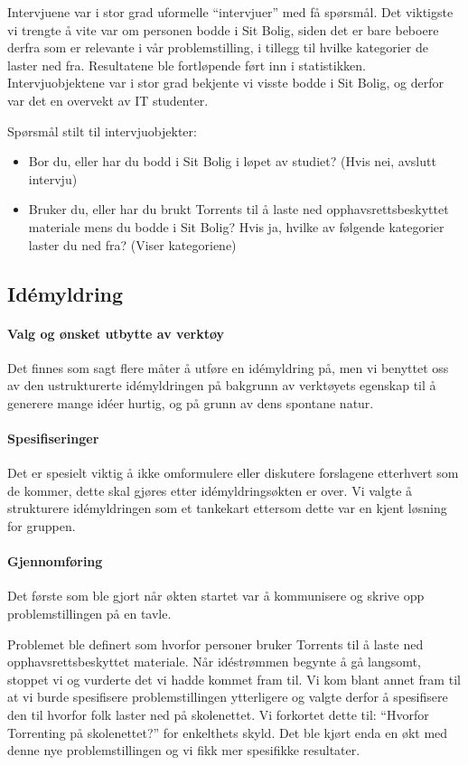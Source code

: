 Intervjuene var i stor grad uformelle ``intervjuer'' med få spørsmål. Det viktigste vi trengte å vite var om personen bodde i Sit Bolig, siden det er bare beboere derfra som er relevante i vår problemstilling, i tillegg til hvilke kategorier de laster ned fra. Resultatene ble fortløpende ført inn i statistikken. Intervjuobjektene var i stor grad bekjente vi visste bodde i Sit Bolig, og derfor var det en overvekt av IT studenter.

Spørsmål stilt til intervjuobjekter:
\begin{itemize}
    \item Bor du, eller har du bodd i Sit Bolig i løpet av studiet? (Hvis nei, avslutt intervju)
    \item Bruker du, eller har du brukt Torrents til å laste ned opphavsrettsbeskyttet materiale mens du bodde i Sit Bolig? Hvis ja, hvilke av følgende kategorier laster du ned fra? (Viser kategoriene)
\end{itemize}


\subsection{Idémyldring}

\paragraph{Valg og ønsket utbytte av verktøy}
Det finnes som sagt flere måter å utføre en idémyldring på, men vi benyttet oss av den ustrukturerte idémyldringen på bakgrunn av verktøyets egenskap til å generere mange idéer hurtig, og på grunn av dens spontane natur. 

\paragraph{Spesifiseringer}
Det er spesielt viktig å ikke omformulere eller diskutere forslagene etterhvert som de kommer, dette skal gjøres etter idémyldringsøkten er over. Vi valgte å strukturere idémyldringen som et tankekart ettersom dette var en kjent løsning for gruppen. 

\paragraph{Gjennomføring}
Det første som ble gjort når økten startet var å kommunisere og skrive opp problemstillingen på en tavle. 

Problemet ble definert som hvorfor personer bruker Torrents til å laste ned opphavsrettsbeskyttet materiale. Når idéstrømmen begynte å gå langsomt, stoppet vi og vurderte det vi hadde kommet fram til. Vi kom blant annet fram til at vi burde spesifisere problemstillingen ytterligere og valgte derfor å spesifisere den til hvorfor folk laster ned på skolenettet. Vi forkortet dette til: ``Hvorfor Torrenting på skolenettet?'' for enkelthets skyld. Det ble kjørt enda en økt med denne nye problemstillingen og vi fikk mer spesifikke resultater.


